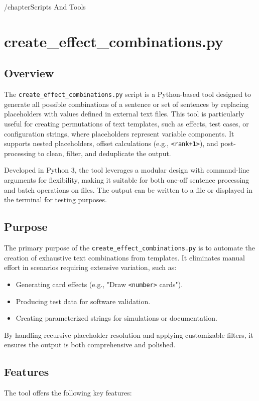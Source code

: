 /chapter{Scripts And Tools}






\section{create_effect_combinations.py}
\subsection{Overview}
The \texttt{create_effect_combinations.py} script is a Python-based tool designed to generate all possible combinations of a sentence or set of sentences by replacing placeholders with values defined in external text files. This tool is particularly useful for creating permutations of text templates, such as effects, test cases, or configuration strings, where placeholders represent variable components. It supports nested placeholders, offset calculations (e.g., \texttt{<rank+1>}), and post-processing to clean, filter, and deduplicate the output.

Developed in Python 3, the tool leverages a modular design with command-line arguments for flexibility, making it suitable for both one-off sentence processing and batch operations on files. The output can be written to a file or displayed in the terminal for testing purposes.

\subsection{Purpose}
The primary purpose of the \texttt{create_effect_combinations.py} is to automate the creation of exhaustive text combinations from templates. It eliminates manual effort in scenarios requiring extensive variation, such as:
\begin{itemize}
    \item Generating card effects (e.g., "Draw \texttt{<number>} cards").
    \item Producing test data for software validation.
    \item Creating parameterized strings for simulations or documentation.
\end{itemize}
By handling recursive placeholder resolution and applying customizable filters, it ensures the output is both comprehensive and polished.

\subsection{Features}
The tool offers the following key features:


